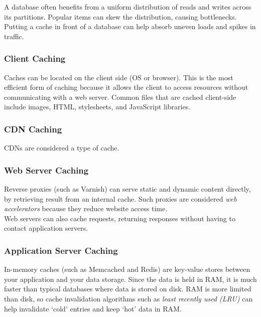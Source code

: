 \documentclass[12pt, titlepage]{article}
\begin{document}
A database often benefits from a uniform distribution of reads and writes across its partitions. Popular items can skew the distribution, causing bottlenecks. Putting a cache in front of a database can help absorb uneven loads and spikes in traffic. \\

\subsubsection{Client Caching}

Caches can be located on the client side (OS or browser). This is the most efficient form of caching because it allows the client to access resources without communicating with a web server. Common files that are cached client-side include images, HTML, stylesheets, and JavaScript libraries.

\subsubsection{CDN Caching}

CDNs are considered a type of cache.

\subsubsection{Web Server Caching}

Reverse proxies (such as Varnish) can serve static and dynamic content directly, by retrieving result from an internal cache. Such proxies are considered \textit{web accelerators} because they reduce website access time. \\

Web servers can also cache requests, returning responses without having to contact application servers.

\subsubsection{Application Server Caching}

In-memory caches (such as Memcached and Redis) are key-value stores between your application and your data storage. Since the data is held in RAM, it is much faster than typical databases where data is stored on disk. RAM is more limited than disk, so cache invalidation algorithms such as \textit{least recently used (LRU)} can help invalidate `cold' entries and keep `hot' data in RAM. \\
\end{document}
